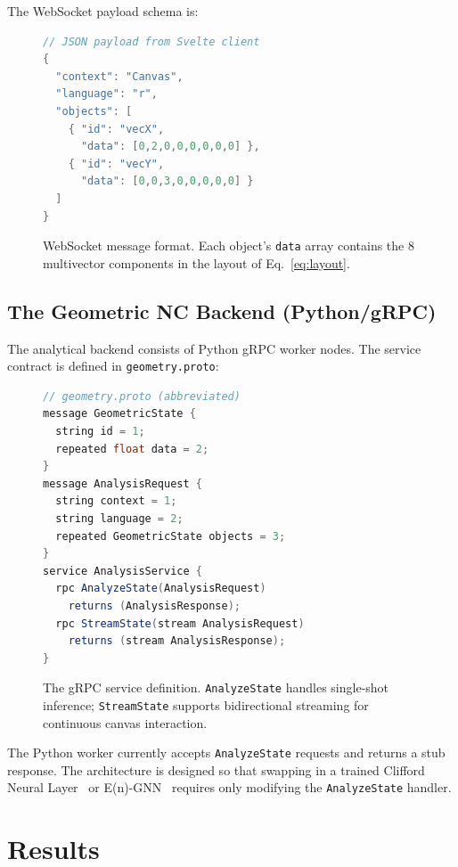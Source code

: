 \documentclass[conference]{IEEEtran}
\begin{document}
The WebSocket payload schema is:
\begin{figure}[htbp]
\begin{lstlisting}[language=Java]
// JSON payload from Svelte client
{
  "context": "Canvas",
  "language": "r",
  "objects": [
    { "id": "vecX",
      "data": [0,2,0,0,0,0,0,0] },
    { "id": "vecY",
      "data": [0,0,3,0,0,0,0,0] }
  ]
}
\end{lstlisting}
\caption{WebSocket message format. Each object's \texttt{data} array contains the 8 multivector components in the layout of Eq.~\ref{eq:layout}.}
\label{fig:ws_payload}
\end{figure}

\subsection{The Geometric NC Backend (Python/gRPC)}
The analytical backend consists of Python gRPC worker nodes. The service contract is defined in \texttt{geometry.proto}:

\begin{figure}[htbp]
\begin{lstlisting}[language=Java]
// geometry.proto (abbreviated)
message GeometricState {
  string id = 1;
  repeated float data = 2;
}
message AnalysisRequest {
  string context = 1;
  string language = 2;
  repeated GeometricState objects = 3;
}
service AnalysisService {
  rpc AnalyzeState(AnalysisRequest)
    returns (AnalysisResponse);
  rpc StreamState(stream AnalysisRequest)
    returns (stream AnalysisResponse);
}
\end{lstlisting}
\caption{The gRPC service definition. \texttt{AnalyzeState} handles single-shot inference; \texttt{StreamState} supports bidirectional streaming for continuous canvas interaction.}
\label{fig:proto}
\end{figure}

The Python worker currently accepts \texttt{AnalyzeState} requests and returns a stub response. The architecture is designed so that swapping in a trained Clifford Neural Layer~\cite{b_ruhe} or E(n)-GNN~\cite{b_satorras} requires only modifying the \texttt{AnalyzeState} handler.

\section{Results}
\label{sec:results}
\end{document}
